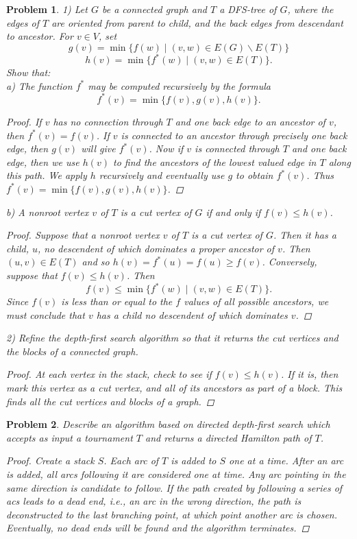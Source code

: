 \documentclass{article}
\newtheorem{problem}{Problem}
\begin{document}
\begin{problem}
1) Let $G$ be a connected graph and $T$ a DFS-tree of $G$, where the edges of $T$ are oriented from parent to child, and the back edges from descendant to ancestor. For $v \in V$, set
\[
g(v) = \min \{f(w) \mid (v,w) \in E(G) \backslash E(T)\}
\]
\[
h(v) = \min \{f^*(w) \mid (v,w) \in E(T)\}.
\]
Show that:\\
a) The function $f^*$ may be computed recursively by the formula
\[
f^*(v) = \min \{f(v), g(v), h(v)\}.
\]
\begin{proof}
If $v$ has no connection through $T$ and one back edge to an ancestor of $v$, then $f^*(v) = f(v)$. If $v$ is connected to an ancestor through precisely one back edge, then $g(v)$ will give $f^*(v)$. Now if $v$ is connected through $T$ and one back edge, then we use $h(v)$ to find the ancestors of the lowest valued edge in $T$ along this path. We apply $h$ recursively and eventually use $g$ to obtain $f^*(v)$. Thus $f^*(v) = \min \{f(v), g(v), h(v)\}$.
\end{proof}
b) A nonroot vertex $v$ of $T$ is a cut vertex of $G$ if and only if $f(v) \leq h(v)$.
\begin{proof}
Suppose that a nonroot vertex $v$ of $T$ is a cut vertex of $G$. Then it has a child, $u$, no descendent of which dominates a proper ancestor of $v$. Then $(u,v) \in E(T)$ and so $h(v) = f^*(u) = f(u) \geq f(v)$. Conversely, suppose that $f(v) \leq h(v)$. Then
\[
f(v) \leq \min \{f^*(w) \mid (v,w) \in E(T)\}.
\]
Since $f(v)$ is less than or equal to the $f$ values of all possible ancestors, we must conclude that $v$ has a child no descendent of which dominates $v$.
\end{proof}
2) Refine the depth-first search algorithm so that it returns the cut vertices and the blocks of a connected graph.
\begin{proof}
At each vertex in the stack, check to see if $f(v) \leq h(v)$. If it is, then mark this vertex as a cut vertex, and all of its ancestors as part of a block. This finds all the cut vertices and blocks of a graph.
\end{proof}
\end{problem}

\begin{problem}
Describe an algorithm based on directed depth-first search which accepts as input a tournament $T$ and returns a directed Hamilton path of $T$.
\begin{proof}
Create a stack $S$. Each arc of $T$ is added to $S$ one at a time. After an arc is added, all arcs following it are considered one at time. Any arc pointing in the same direction is candidate to follow. If the path created by following a series of acs leads to a dead end, i.e., an arc in the wrong direction, the path is deconstructed to the last branching point, at which point another arc is chosen. Eventually, no dead ends will be found and the algorithm terminates.
\end{proof}
\end{problem}
\end{document}
